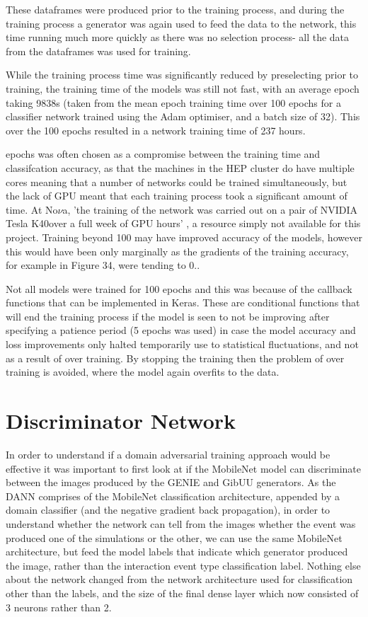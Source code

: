 \noindent These dataframes were produced prior to the training process, and during the training process a generator was again used to feed the data to the network, this time running much more quickly as there was no selection process- all the data from the dataframes was used for training.\medskip

\noindent While the training process time was significantly reduced by preselecting prior to training, the training time of the models was still not fast, with an average epoch taking 9838s (taken from the mean epoch training time over 100 epochs for a classifier network trained using the Adam optimiser, and a batch size of 32). This over the 100 epochs resulted in a network training time of 237 hours.\medskip

 epochs was often chosen as a compromise between the training time and classifcation accuracy, as that the machines in the HEP cluster do have multiple cores meaning that a number of networks could be trained simultaneously, but the lack of GPU meant that each training process took a significant amount of time. At No$\nu$a, 'the training of the network was carried out on a pair of NVIDIA Tesla K40over a full week of GPU hours' \cite{Aurisano}, a resource simply not available for this project. Training beyond 100 may have improved accuracy of the models, however this would have been only marginally as the gradients of the training accuracy, for example in Figure 34, were tending to 0.\medskip. 

\noindent Not all models were trained for 100 epochs and this was because of the callback functions that can be implemented in Keras. These are conditional functions that will end the training process if the model is seen to not be improving after specifying a patience period (5 epochs was used) in case the model accuracy and loss improvements only halted temporarily use to statistical fluctuations, and not as a result of over training. By stopping the training then the problem of over training is avoided, where the model again overfits to the data.\medskip

\section{Discriminator Network}

\noindent In order to understand if a domain adversarial training approach would be effective it was important to first look at if the MobileNet model can discriminate between the images produced by the GENIE and GibUU generators. As the DANN comprises of the MobileNet classification architecture, appended by a domain classifier (and the negative gradient back propagation), in order to understand whether the network can tell from the images whether the event was produced one of the simulations or the other, we can use the same MobileNet architecture, but feed the model labels that indicate which generator produced the image, rather than the interaction event type classification label. Nothing else about the network changed from the network architecture used for classification other than the labels, and the size of the final dense layer which now consisted of 3 neurons rather than 2. \medskip

